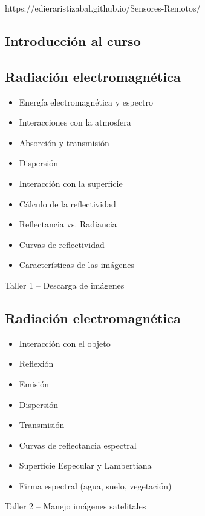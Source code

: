 \documentclass[a4paper,twoside,11pt,]{article}
\begin{document}
https://edieraristizabal.github.io/Sensores-Remotos/

\subsection*{Introducción al curso}

\subsection {Radiación electromagnética}
\begin{itemize}
\item Energía electromagnética y espectro
\item Interacciones con la atmosfera
\item Absorción y transmisión
\item Dispersión
\item Interacción con la superficie
\item Cálculo de la reflectividad
\item Reflectancia vs. Radiancia
\item Curvas de reflectividad
\item Características de las imágenes
\end{itemize}

\begin{tcolorbox}[enhanced,width=5in,center upper,  fontupper=\large\bfseries,drop shadow southwest,sharp corners]
Taller 1 -- Descarga de imágenes
\end{tcolorbox}

\subsection {Radiación electromagnética}
\begin{itemize}
\item Interacción con el objeto
\item Reflexión
\item Emisión
\item Dispersión
\item Transmisión
\item Curvas de reflectancia espectral
\item Superficie Especular y Lambertiana
\item Firma espectral (agua, suelo, vegetación)
\end{itemize}

\begin{tcolorbox}[enhanced,width=5in,center upper,  fontupper=\large\bfseries,drop shadow southwest,sharp corners]
Taller 2 -- Manejo imágenes satelitales
\end{tcolorbox}
\end{document}
